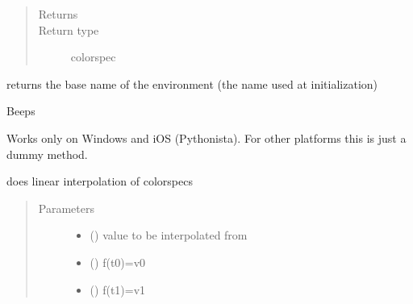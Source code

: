 \documentclass[letterpaper,10pt,english]{sphinxmanual}
\begin{document}
\begin{fulllineitems}
\begin{fulllineitems}
\begin{quote}
\begin{description}
\item[{Returns}] \leavevmode
{}

\item[{Return type}] \leavevmode
colorspec

\end{description}\end{quote}

\end{fulllineitems}


\begin{fulllineitems}
\label{\detokenize{Reference:salabim.Environment.base_name}}
returns the base name of the environment (the name used at initialization)

\end{fulllineitems}


\begin{fulllineitems}
\label{\detokenize{Reference:salabim.Environment.beep}}
Beeps

Works only on Windows and iOS (Pythonista). For other platforms this is just a dummy method.

\end{fulllineitems}


\begin{fulllineitems}
\label{\detokenize{Reference:salabim.Environment.colorinterpolate}}
does linear interpolation of colorspecs
\begin{quote}\begin{description}
\item[{Parameters}] \leavevmode\begin{itemize}
\item {} 
 () \textendash{} value to be interpolated from

\item {} 
 () \textendash{} f(t0)=v0

\item {} 
 () \textendash{} f(t1)=v1


\end{itemize}
\end{description}
\end{quote}
\end{fulllineitems}
\end{fulllineitems}
\end{document}
